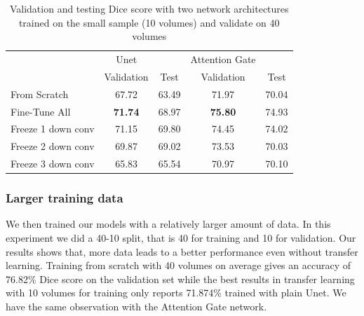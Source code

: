\begin{table}[h]
\centering
\begin{tabular}{l c c c c}
\hline
\hline
	&	Unet	&		&	Attention Gate	&		\\
	&	Validation	&	 Test	&	Validation	&	Test	\\
\hline
From Scratch		&	67.72	&	 63.49		& 71.97&	70.04	\\
Fine-Tune All	&	\textbf{71.74}	& 68.97	& \textbf{75.80}& 74.93		\\
Freeze 1 down conv	&	71.15	&	69.80	& 74.45&  74.02	\\
Freeze 2 down conv	&	69.87	&	69.02	& 73.53& 70.03	\\
Freeze 3 down conv	&	65.83	& 65.54 & 70.97&	70.10	\\
\hline
\end{tabular}
\caption{Validation and testing Dice score with two network architectures trained on the small sample (10 volumes) and validate on 40 volumes}
\label{tab:10-transfer}
\end{table}


\subsubsection{Larger training data}
We then trained our models with a relatively larger amount of data. In this experiment we did a 40-10 split, that is 40 for training and 10 for validation. Our results shows that, more data leads to a better performance even without transfer learning. Training from scratch with 40 volumes on average gives an accuracy of {\color{red} 76.82\% Dice score on the validation set while the best results in transfer learning with 10 volumes for training only reports 71.874\% trained with plain Unet. We have the same observation with the Attention Gate network.}\\


